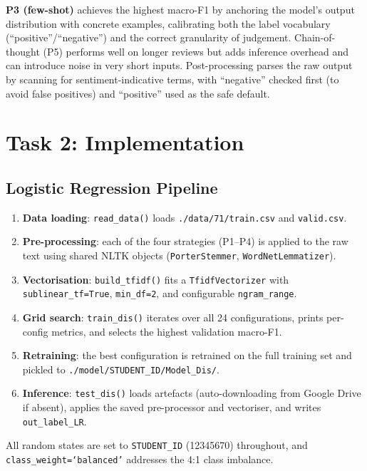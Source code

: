 \documentclass[10pt,twocolumn]{article}
\begin{document}
\textbf{P3 (few-shot)} achieves the highest macro-F1 by anchoring the
model's output distribution with concrete examples, calibrating both the
label vocabulary (``positive''/``negative'') and the correct granularity
of judgement.
Chain-of-thought (P5) performs well on longer reviews but adds inference
overhead and can introduce noise in very short inputs.
Post-processing parses the raw output by scanning for sentiment-indicative
terms, with ``negative'' checked first (to avoid false positives) and
``positive'' used as the safe default.

\section{Task 2: Implementation}
\label{sec:task2}

\subsection{Logistic Regression Pipeline}

\begin{enumerate}
  \item \textbf{Data loading}: \texttt{read\_data()} loads
    \texttt{./data/71/train.csv} and \texttt{valid.csv}.
  \item \textbf{Pre-processing}: each of the four strategies (P1--P4)
    is applied to the raw text using shared NLTK objects
    (\texttt{PorterStemmer}, \texttt{WordNetLemmatizer}).
  \item \textbf{Vectorisation}: \texttt{build\_tfidf()} fits a
    \texttt{TfidfVectorizer} with \texttt{sublinear\_tf=True},
    \texttt{min\_df=2}, and configurable \texttt{ngram\_range}.
  \item \textbf{Grid search}: \texttt{train\_dis()} iterates over all
    24 configurations, prints per-config metrics, and selects the
    highest validation macro-F1.
  \item \textbf{Retraining}: the best configuration is retrained on the
    full training set and pickled to
    \texttt{./model/STUDENT\_ID/Model\_Dis/}.
  \item \textbf{Inference}: \texttt{test\_dis()} loads artefacts
    (auto-downloading from Google Drive if absent), applies the saved
    pre-processor and vectoriser, and writes \texttt{out\_label\_LR}.
\end{enumerate}

All random states are set to \texttt{STUDENT\_ID} (12345670) throughout,
and \texttt{class\_weight=`balanced'} addresses the 4:1 class imbalance.
\end{document}
